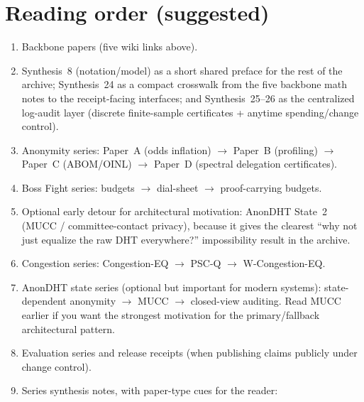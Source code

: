 \documentclass[11pt]{article}
\begin{document}
\section{Reading order (suggested)}
\begin{enumerate}[leftmargin=*]
\item Backbone papers (five wiki links above).
\item Synthesis~8 (notation/model) as a short shared preface for the rest of the archive; Synthesis~24 as a compact crosswalk from the five backbone math notes to the receipt-facing interfaces; and Synthesis~25--26 as the centralized log-audit layer (discrete finite-sample certificates + anytime spending/change control).
\item Anonymity series: Paper~A (odds inflation) $\rightarrow$ Paper~B (profiling) $\rightarrow$ Paper~C (ABOM/OINL) $\rightarrow$ Paper~D (spectral delegation certificates).
\item Boss Fight series: budgets $\rightarrow$ dial-sheet $\rightarrow$ proof-carrying budgets.
\item Optional early detour for architectural motivation: AnonDHT State~2 (MUCC / committee-contact privacy), because it gives the clearest ``why not just equalize the raw DHT everywhere?'' impossibility result in the archive.
\item Congestion series: Congestion-EQ $\rightarrow$ PSC-Q $\rightarrow$ W-Congestion-EQ.
\item AnonDHT state series (optional but important for modern systems): state-dependent anonymity $\rightarrow$ MUCC $\rightarrow$ closed-view auditing. Read MUCC earlier if you want the strongest motivation for the primary/fallback architectural pattern.
\item Evaluation series and release receipts (when publishing claims publicly under change control).
\item Series synthesis notes, with paper-type cues for the reader:

\end{enumerate}
\end{document}
